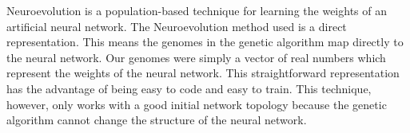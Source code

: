 Neuroevolution is a population-based technique for learning the weights of an artificial neural network.  The Neuroevolution method used is a direct representation. This means the genomes in the genetic algorithm map directly to the neural network. Our genomes were simply a vector of real numbers which represent the weights of the neural network. This straightforward representation has the advantage of being easy to code and easy to train. This technique, however, only works with a good initial network topology because the genetic algorithm cannot change the structure of the neural network.

